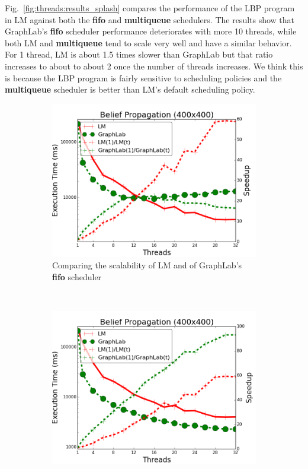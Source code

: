 Fig.~\ref{fig:threads:results_splash} compares the performance of the LBP
program in LM against both the \textbf{fifo} and \textbf{multiqueue} schedulers.
The results show that GraphLab's \textbf{fifo} scheduler performance
deteriorates with more 10 threads, while both LM and \textbf{multiqueue} tend to
scale very well and have a similar behavior. For 1 thread, LM is about 1.5
times slower than GraphLab but that ratio increases to about to about 2 once the
number of threads increases. We think this is because the LBP program is fairly
sensitive to scheduling policies and the \textbf{multiqueue} scheduler is
better than LM's default scheduling policy.

\begin{figure}[]
        \centering
        \begin{subfigure}[b]{\plotsize\textwidth}
           \includegraphics[width=\textwidth]{experiments/threads/cmp-fifo-belief-propagation-400.png}
           \caption{Comparing the scalability of LM and of GraphLab's
              \textbf{fifo} scheduler}
           \label{fig:threads:splash_fifo}
        \end{subfigure}
        ~ ~
        \begin{subfigure}[b]{\plotsize\textwidth}
           \includegraphics[width=\textwidth]{experiments/threads/cmp-multi-belief-propagation-400.png}

\end{subfigure}
\end{figure}
